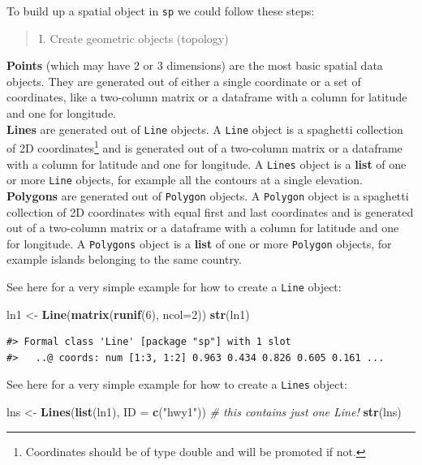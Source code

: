 \documentclass[]{book}
\newenvironment{Shaded}{\begin{snugshade}}{\end{snugshade}}
\newcommand{\KeywordTok}[1]{\textcolor[rgb]{0.13,0.29,0.53}{\textbf{#1}}}
\newcommand{\DataTypeTok}[1]{\textcolor[rgb]{0.13,0.29,0.53}{#1}}
\newcommand{\DecValTok}[1]{\textcolor[rgb]{0.00,0.00,0.81}{#1}}
\newcommand{\StringTok}[1]{\textcolor[rgb]{0.31,0.60,0.02}{#1}}
\newcommand{\CommentTok}[1]{\textcolor[rgb]{0.56,0.35,0.01}{\textit{#1}}}
\newcommand{\NormalTok}[1]{#1}
\let\rmarkdownfootnote\footnote%
\def\footnote{\protect\rmarkdownfootnote}
\theoremstyle{definition}
\theoremstyle{definition}
\theoremstyle{definition}
\theoremstyle{remark}
\begin{document}
To build up a spatial object in \texttt{sp} we could follow these steps:

\begin{quote}
I. Create geometric objects (topology)
\end{quote}

\textbf{Points} (which may have 2 or 3 dimensions) are the most basic
spatial data objects. They are generated out of either a single
coordinate or a set of coordinates, like a two-column matrix or a
dataframe with a column for latitude and one for longitude.\\
\textbf{Lines} are generated out of \texttt{Line} objects. A
\texttt{Line} object is a spaghetti collection of 2D
coordinates\footnote{Coordinates should be of type double and will be
  promoted if not.} and is generated out of a two-column matrix or a
dataframe with a column for latitude and one for longitude. A
\texttt{Lines} object is a \textbf{list} of one or more \texttt{Line}
objects, for example all the contours at a single elevation.\\
\textbf{Polygons} are generated out of \texttt{Polygon} objects. A
\texttt{Polygon} object is a spaghetti collection of 2D coordinates with
equal first and last coordinates and is generated out of a two-column
matrix or a dataframe with a column for latitude and one for longitude.
A \texttt{Polygons} object is a \textbf{list} of one or more
\texttt{Polygon} objects, for example islands belonging to the same
country.

See here for a very simple example for how to create a \texttt{Line}
object:

\begin{Shaded}
\begin{Highlighting}[]
\NormalTok{ln1 <-}\StringTok{ }\KeywordTok{Line}\NormalTok{(}\KeywordTok{matrix}\NormalTok{(}\KeywordTok{runif}\NormalTok{(}\DecValTok{6}\NormalTok{), }\DataTypeTok{ncol=}\DecValTok{2}\NormalTok{))}
\KeywordTok{str}\NormalTok{(ln1)}
\end{Highlighting}
\end{Shaded}

\begin{verbatim}
#> Formal class 'Line' [package "sp"] with 1 slot
#>   ..@ coords: num [1:3, 1:2] 0.963 0.434 0.826 0.605 0.161 ...
\end{verbatim}

See here for a very simple example for how to create a \texttt{Lines}
object:

\begin{Shaded}
\begin{Highlighting}[]
\NormalTok{lns <-}\StringTok{ }\KeywordTok{Lines}\NormalTok{(}\KeywordTok{list}\NormalTok{(ln1), }\DataTypeTok{ID =} \KeywordTok{c}\NormalTok{(}\StringTok{"hwy1"}\NormalTok{)) }\CommentTok{# this contains just one Line!}
\KeywordTok{str}\NormalTok{(lns)}
\end{Highlighting}
\end{Shaded}
\end{document}
